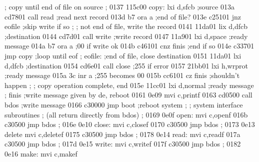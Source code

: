                             ;        copy until end of file on source
                            ;
0137 115c00                 copy:    lxi  d,sfcb    ;source
013a cd7801                          call read      ;read next record
013d b7                              ora  a         ;end of file?
013e c25101                          jnz  eofile    ;skip write if so
                            ;
                            ;        not end of file, write the record
0141 11da01                          lix  d,dfcb    ;destination
0144 cd7d01                          call write     ;write record
0147 11a901                          lxi  d,space   ;ready message
014a b7                              ora  a         ;00 if write ok
014b c46101                          cnz  finis     ;end if so
014e c33701                          jmp  copy      ;loop until eof
                            ;
                            eofile:  ;end of file, close destination
0151 11da01                          lxi  d,dfcb    ;destination
0154 cd6e01                          call close     ;255 if error
0157 21bb01                          lxi  h,wrprot  ;ready message
015a 3c                              inr  a         ;255 becomes 00
015b cc6101                          cz   finis     ;shouldn't happen
                            ;
                            ;        copy operation complete, end
015e 11cc01                          lxi  d,normal  ;ready message
                            ;
                            finis    ;write message given by de, reboot
0161 0e09                            mvi  c,printf
0163 cd0500                          call bdos      ;write message
0166 c30000                          jmp  boot      ;reboot system
                            ;
                            ;        system interface subroutines
                            ;        (all return directly from bdos)
                            ;
0169 0e0f                   open:    mvi  c,openf
016b c30500                          jmp  bdos
                            ;
016e 0e10                   close:   mvi  c,closef
0170 c30500                          jmp  bdos
                            ;
0173 0e13                   delete   mvi  c,deletef
0175 c30500                          jmp  bdos
                            ;
0178 0e14                   read:    mvi  c,readf
017a c30500                          jmp  bdos
                            ;
017d 0e15                   write:   mvi  c,writef
017f c30500                          jmp  bdos
                            ;
0182 0e16                   make:    mvi  c,makef
